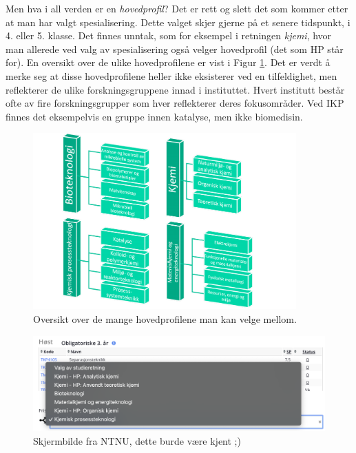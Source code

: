 Men hva i all verden er en \textit{hovedprofil}? Det er rett og slett det som kommer etter at man har valgt spesialisering. Dette valget skjer gjerne på et senere tidspunkt, i 4. eller 5. klasse. Det finnes unntak, som for eksempel i retningen \textit{kjemi}, hvor man allerede ved valg av spesialisering også velger hovedprofil (det som HP står for). En oversikt over de ulike hovedprofilene er vist i Figur \ref{fig:Spesialisering-Hovedprofiler}. Det er verdt å merke seg at disse hovedprofilene heller ikke eksisterer ved en tilfeldighet, men reflekterer de ulike forskningsgruppene innad i instituttet. Hvert institutt består ofte av fire forskningsgrupper som hver reflekterer deres fokusområder. Ved IKP finnes det eksempelvis en gruppe innen katalyse, men ikke biomedisin. 

\begin{figure}[H]
    \centering
    \includegraphics[width=0.9\textwidth]{images/Spesialisering-Retninger.pdf}
    \caption{Oversikt over de mange hovedprofilene man kan velge mellom.}
    \label{fig:Spesialisering-Hovedprofiler}
\end{figure}


\begin{figure}[H]
    \centering
    \includegraphics[width=1\textwidth]{images/spesialisering.png}
    \caption{Skjermbilde fra NTNU, dette burde være kjent ;)}
    \label{fig:Spesialisering-Screenshot}
\end{figure}


